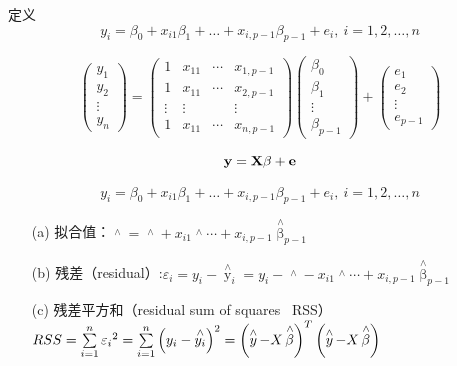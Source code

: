 \documentclass[xetex,mathserif,serif]{beamer}
\begin{document}
\begin{frame}{定义}
\[ y_i = \beta_0+x_{i1}\beta_1+ \dots + x_{i,p-1}\beta_{p-1}+e_i, \ i=1,2,\dots,n\]

\[\left( {\begin{array}{*{20}{c}}
{{y_1}}\\
{{y_2}}\\
 \vdots \\
{{y_n}}
\end{array}} \right) = \left( {\begin{array}{*{20}{c}}
1&{{x_{11}}}& \cdots &{{x_{1,p - 1}}}\\
1&{{x_{11}}}& \cdots &{{x_{2,p - 1}}}\\
 \vdots & \vdots &{}& \vdots \\
1&{{x_{11}}}& \cdots &{{x_{n,p - 1}}}
\end{array}} \right)\left( {\begin{array}{*{20}{c}}
{{\beta _0}}\\
{{\beta _1}}\\
 \vdots \\
{{\beta _{p - 1}}}
\end{array}} \right) + \left( {\begin{array}{*{20}{c}}
{{e_1}}\\
{{e_2}}\\
 \vdots \\
{{e_{p - 1}}}
\end{array}} \right)\]

\[\bf{y}=\bf{X\beta}+\bf{e}\]

\end{frame}

\begin{frame}
\[ y_i = \beta_0+x_{i1}\beta_1+ \dots + x_{i,p-1}\beta_{p-1}+e_i, \ i=1,2,\dots,n\]
\begin{itemize}
  \item[(a)] 拟合值：$\mathop {{y_i}}\limits^ \wedge   = \mathop {{\beta _0}}\limits^ \wedge   + {x_{i1}}\mathop {{\beta _1}}\limits^ \wedge   \cdots  + {x_{i,p - 1}}{{\mathop \beta \limits^ \wedge}  _{p - 1}}$
  \item[(b)] 残差（residual）:${\varepsilon _i} = {y_i} - {{\mathop y\limits^ \wedge}  _i} = {y_i} - \mathop {{\beta _0}}\limits^ \wedge   - {x_{i1}}\mathop {{\beta _1}}\limits^ \wedge   \cdots  + {x_{i,p - 1}}{{\mathop \beta \limits^ \wedge }_{p - 1}}$
  \item[(c)] 残差平方和（residual sum of squares \ RSS）\ $RSS = \sum\limits_{i = 1}^n {{\varepsilon _i}^2}  = \sum\limits_{i = 1}^n {{{\left( {{y_i} - \mathop {{y_i}}\limits^ \wedge  } \right)}^2}}  = {\left( {\mathop {{\rm{ }}y}\limits^ \wedge   - X\mathop \beta \limits^ \wedge  } \right)^T}\left( {\mathop {{\rm{ }}y}\limits^ \wedge   - X\mathop \beta \limits^ \wedge  } \right)$
\end{itemize}
\end{frame}
\end{document}
